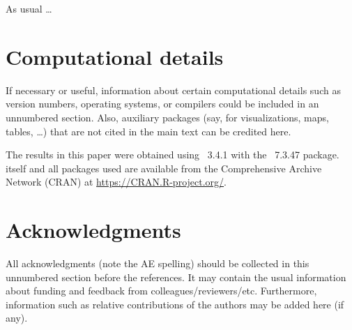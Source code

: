 \documentclass[article]{jss}
\begin{document}
\begin{leftbar}
As usual \dots
\end{leftbar}



\section*{Computational details}

\begin{leftbar}
If necessary or useful, information about certain computational details
such as version numbers, operating systems, or compilers could be included
in an unnumbered section. Also, auxiliary packages (say, for visualizations,
maps, tables, \dots) that are not cited in the main text can be credited here.
\end{leftbar}

The results in this paper were obtained using
~3.4.1 with the
~7.3.47 package.  itself
and all packages used are available from the Comprehensive
 Archive Network (CRAN) at
\url{https://CRAN.R-project.org/}.


\section*{Acknowledgments}

\begin{leftbar}
All acknowledgments (note the AE spelling) should be collected in this
unnumbered section before the references. It may contain the usual information
about funding and feedback from colleagues/reviewers/etc. Furthermore,
information such as relative contributions of the authors may be added here
(if any).
\end{leftbar}






\end{document}
